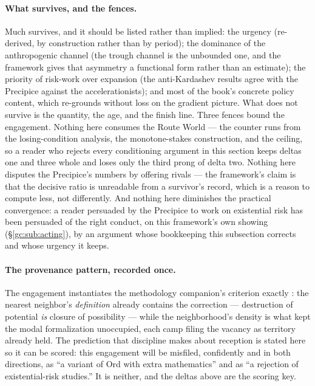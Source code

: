 \documentclass[11pt]{article}
\numberwithin{equation}{section}
\theoremstyle{plain}
\theoremstyle{definition}
\theoremstyle{remark}
\begin{document}
\paragraph{What survives, and the fences.} Much survives, and it
should be listed rather than implied: the urgency (re-derived, by
construction rather than by period); the dominance of the
anthropogenic channel (the trough channel is the unbounded one, and
the framework gives that asymmetry a functional form rather than an
estimate); the priority of risk-work over expansion (the
anti-Kardashev results agree with the Precipice against the
accelerationists); and most of the book's concrete policy content,
which re-grounds without loss on the gradient picture. What does not
survive is the quantity, the age, and the finish line. Three fences
bound the engagement. Nothing here consumes the Route World --- the
counter runs from the losing-condition analysis, the monotone-stakes
construction, and the ceiling, so a reader who rejects every
conditioning argument in this section keeps deltas one and three
whole and loses only the third prong of delta two. Nothing here
disputes the Precipice's numbers by offering rivals --- the
framework's claim is that the decisive ratio is unreadable from a
survivor's record, which is a reason to compute less, not
differently. And nothing here diminishes the practical convergence:
a reader persuaded by the Precipice to work on existential risk has
been persuaded of the right conduct, on this framework's own showing
(\S\ref{gc:sub:acting}), by an argument whose bookkeeping this
subsection corrects and whose urgency it keeps.

\paragraph{The provenance pattern, recorded once.} The engagement
instantiates the methodology companion's criterion exactly
\cite{Ben26Method}: the nearest neighbor's \emph{definition} already
contains the correction --- destruction of potential \emph{is}
closure of possibility --- while the neighborhood's density is what
kept the modal formalization unoccupied, each camp filing the vacancy
as territory already held. The prediction that discipline makes about
reception is stated here so it can be scored: this engagement will be
misfiled, confidently and in both directions, as ``a variant of Ord
with extra mathematics'' and as ``a rejection of existential-risk
studies.'' It is neither, and the deltas above are the scoring key.
\end{document}
